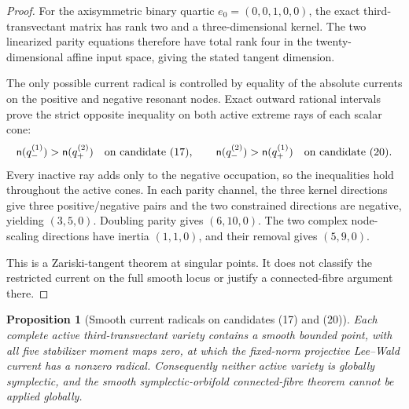 \documentclass[11pt]{article}
\newtheorem{proposition}[theorem]{Proposition}
\theoremstyle{definition}
\theoremstyle{remark}
\begin{document}
\begin{proof}
For the axisymmetric binary quartic \(e_0=(0,0,1,0,0)\), the exact
third-transvectant matrix has rank two and a three-dimensional kernel.  The
two linearized parity equations therefore have total rank four in the
twenty-dimensional affine input space, giving the stated tangent dimension.

The only possible current radical is controlled by equality of the absolute
currents on the positive and negative resonant nodes.  Exact outward rational
intervals prove the strict opposite inequality on both active extreme rays
of each scalar cone:
\[
 \mathsf n(q_-^{(1)})>\mathsf n(q_+^{(2)})
 \quad\hbox{on candidate (17)},
 \qquad
 \mathsf n(q_-^{(2)})>\mathsf n(q_+^{(1)})
 \quad\hbox{on candidate (20)}.
\]
Every inactive ray adds only to the negative occupation, so the inequalities
hold throughout the active cones.  In each parity channel, the three kernel
directions give three positive/negative pairs and the two constrained
directions are negative, yielding \((3,5,0)\).  Doubling parity gives
\((6,10,0)\).  The two complex node-scaling directions have inertia
\((1,1,0)\), and their removal gives \((5,9,0)\).

This is a Zariski-tangent theorem at singular points.  It does not classify
the restricted current on the full smooth locus or justify a connected-fibre
argument there.
\end{proof}

\begin{proposition}[Smooth current radicals on candidates (17) and (20)]
\label{prop:candidate-17-20-smooth-current-radical}
Each complete active third-transvectant variety contains a smooth bounded
point, with all five stabilizer moment maps zero, at which the fixed-norm
projective Lee--Wald current has a nonzero radical.  Consequently neither
active variety is globally symplectic, and the smooth symplectic-orbifold
connected-fibre theorem cannot be applied globally.
\end{proposition}
\end{document}
